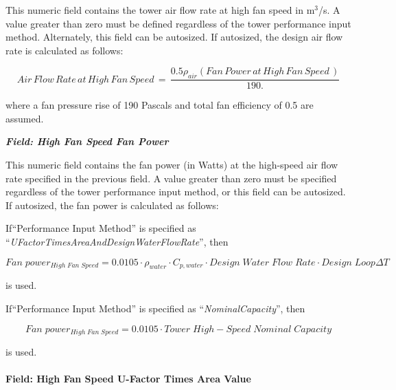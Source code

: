 This numeric field contains the tower air flow rate at high fan speed in m\(^{3}\)/s. A value greater than zero must be defined regardless of the tower performance input method. Alternately, this field can be autosized. If autosized, the design air flow rate is calculated as follows:

\begin{equation}
Air\,Flow\,Rate\,at\,High\,Fan\,Speed\, = \,\frac{{0.5{\rho_{air}}(Fan\,Power\,at\,High\,Fan\,Speed\,)}}{{190.}}
\end{equation}

where a fan pressure rise of 190 Pascals and total fan efficiency of 0.5 are assumed.

\textbf{\emph{Field: High Fan Speed Fan Power}}

This numeric field contains the fan power (in Watts) at the high-speed air flow rate specified in the previous field. A value greater than zero must be specified regardless of the tower performance input method, or this field can be autosized. If autosized, the fan power is calculated as follows:

If``Performance Input Method'' is specified as ``\emph{UFactorTimesAreaAndDesignWaterFlowRate}'', then

\begin{equation}
Fan\;powe{r_{High\;Fan\;Speed}} = 0.0105\cdot {\rho_{water}}\cdot {C_{p,water}}\cdot Design\;Water\;Flow\;Rate\cdot Design\;Loop\Delta T
\end{equation}

is used.

If``Performance Input Method'' is specified as ``\emph{NominalCapacity}'', then

\begin{equation}
Fan\;powe{r_{High\;Fan\;Speed}} = 0.0105\cdot Tower\;High - Speed\;Nominal\;Capacity
\end{equation}

is used.

\paragraph{Field: High Fan Speed U-Factor Times Area Value}\label{field-high-fan-speed-u-factor-times-area-value}

